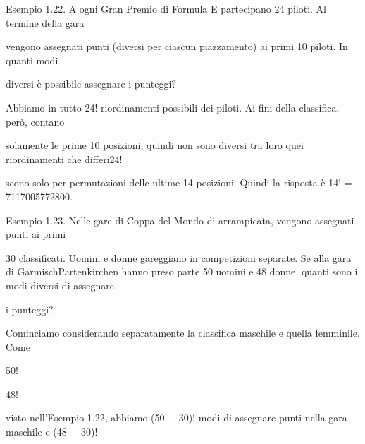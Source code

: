 \documentclass[a4paper,portrait,12pt]{article}
\begin{document}
\begin{flushleft}
Esempio 1.22. A ogni Gran Premio di Formula E partecipano 24 piloti. Al termine della gara
\end{flushleft}


\begin{flushleft}
vengono assegnati punti (diversi per ciascun piazzamento) ai primi 10 piloti. In quanti modi
\end{flushleft}


\begin{flushleft}
diversi \`{e} possibile assegnare i punteggi?
\end{flushleft}


\begin{flushleft}
Abbiamo in tutto 24! riordinamenti possibili dei piloti. Ai fini della classifica, per\`{o}, contano
\end{flushleft}


\begin{flushleft}
solamente le prime 10 posizioni, quindi non sono diversi tra loro quei riordinamenti che differi24!
\end{flushleft}


\begin{flushleft}
scono solo per permutazioni delle ultime 14 posizioni. Quindi la risposta \`{e} 14! = 7117005772800.
\end{flushleft}


\begin{flushleft}
Esempio 1.23. Nelle gare di Coppa del Mondo di arrampicata, vengono assegnati punti ai primi
\end{flushleft}


\begin{flushleft}
30 classificati. Uomini e donne gareggiano in competizioni separate. Se alla gara di GarmischPartenkirchen hanno preso parte 50 uomini e 48 donne, quanti sono i modi diversi di assegnare
\end{flushleft}


\begin{flushleft}
i punteggi?
\end{flushleft}


\begin{flushleft}
Cominciamo considerando separatamente la classifica maschile e quella femminile. Come
\end{flushleft}


50!


48!


\begin{flushleft}
visto nell'Esempio 1.22, abbiamo (50 $-$ 30)! modi di assegnare punti nella gara maschile e (48 $-$ 30)!
\end{flushleft}
\end{document}
